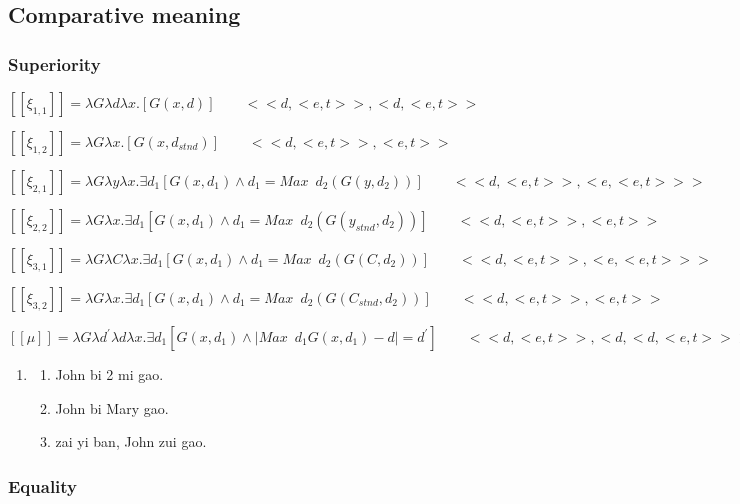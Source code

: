 \documentclass{ctexart}
\begin{document}
\subsection{Comparative meaning}

\subsubsection{Superiority}



$[\![\xi_{1,1}]\!]=\lambda G \lambda d \lambda x .[G(x,d)] \qquad <<d,<e,t>>,<d,<e,t>>$


$[\![\xi_{1,2}]\!]=\lambda G \lambda x .[G(x,d_{stnd})] \qquad <<d,<e,t>>,<e,t>>$

$[\![\xi_{2,1}]\!]=\lambda G \lambda y \lambda x . \exists d_1 [G(x,d_1) \land d_1=Max \enspace d_2(G(y,d_2))] \qquad <<d,<e,t>>,<e,<e,t>>>$

$[\![\xi_{2,2}]\!]=\lambda G \lambda x . \exists d_1 [G(x,d_1) \land d_1=Max \enspace d_2(G(y_{stnd},d_2))] \qquad <<d,<e,t>>,<e,t>>$

$[\![\xi_{3,1}]\!]=\lambda G \lambda C \lambda x . \exists d_1 [G(x,d_1) \land d_1=Max \enspace d_2(G(C,d_2))] \qquad <<d,<e,t>>,<e,<e,t>>>$

$[\![\xi_{3,2}]\!]=\lambda G \lambda x . \exists d_1 [G(x,d_1) \land d_1=Max \enspace d_2(G(C_{stnd},d_2))] \qquad <<d,<e,t>>,<e,t>>$


$[\![\mu]\!]=\lambda G \lambda d^{\prime} \lambda d \lambda x. \exists d_1[G(x, d_1) \land | Max \enspace d_1 G(x,d_1)-d | =d^{\prime}] \qquad <<d,<e,t>>, <d,<d,<e,t>>>>$





\begin{enumerate}[resume]
    \item
    \begin{enumerate}[ref=(\arabic{enumi}\alph*)]
        \item John bi 2 mi gao.
        \item John bi Mary gao.
        \item zai yi ban, John zui gao.
    \end{enumerate}
\end{enumerate}

\subsubsection{Equality}
\end{document}
